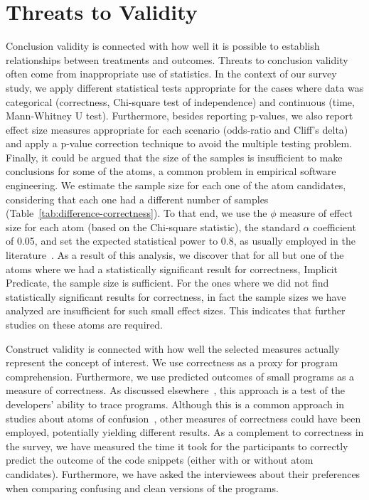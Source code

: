 \section{Threats to Validity}
\label{threat}

Conclusion validity is connected with how well it is possible to establish relationships between treatments and outcomes. Threats to conclusion validity often come from inappropriate use of statistics. In the context of our survey study, we apply different statistical tests appropriate for the cases where data was categorical (correctness, Chi-square test of independence) and continuous (time, Mann-Whitney U test). Furthermore, besides reporting p-values, we also report effect size measures appropriate for each scenario (odds-ratio and Cliff's delta) and apply a p-value correction technique to avoid the multiple testing problem. Finally, it could be argued that the size of the samples is insufficient to make conclusions for some of the atoms, a common problem in empirical software engineering. We estimate the sample size for each one of the atom candidates, considering that each one had a different number of samples (Table~\ref{tab:difference-correctness}). To that end, we use the $\phi$ measure of effect size for each atom (based on the Chi-square statistic), the standard $\alpha$ coefficient of 0.05, and set the expected statistical power to 0.8, as usually employed in the literature~\cite{Ellis:2010:EGE}. As a result of this analysis, we discover that for all but one of the atoms where we had a statistically significant result for correctness, Implicit Predicate, the sample size is sufficient. For the ones where we did not find statistically significant results for correctness, in fact the sample sizes we have analyzed are insufficient for such small effect sizes. This indicates that further studies on these atoms are required.


Construct validity is connected with how well the selected measures actually represent the concept of interest. We use correctness as a proxy for program comprehension. Furthermore, we use predicted outcomes of small programs as a measure of correctness. As discussed elsewhere~\cite{Oliveira:2020:ECR}, this approach is a test of the developers' ability to trace programs. Although this is a common approach in studies about atoms of confusion~\cite{TheEyesDoNotLie,Langhout:2021:ACJ,DBLP:conf/sigsoft/GopsteinIYDZYC17}, other measures of correctness could have been employed, potentially yielding different results. As a complement to correctness in the survey, we have measured the time it took for the participants to correctly predict the outcome of the code snippets (either with or without atom candidates). Furthermore, we have  asked the interviewees about their preferences when comparing confusing and clean versions of the programs.

